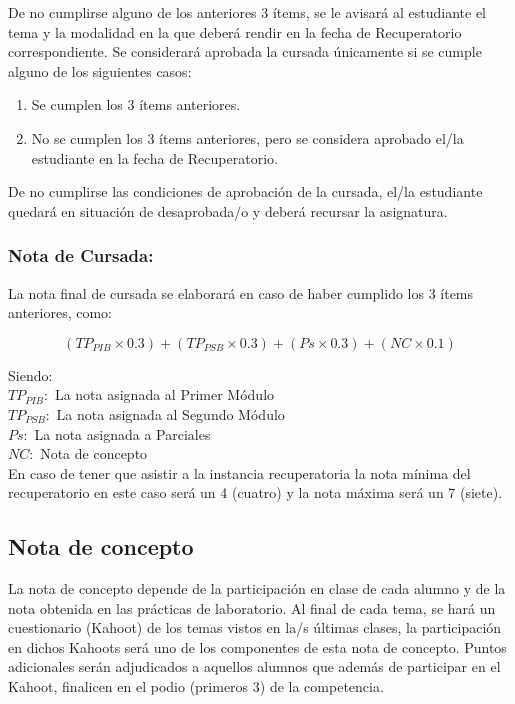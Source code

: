 \documentclass[10pt]{article}
\begin{document}
\vspace{0.25cm}
De no cumplirse alguno de los anteriores 3  ítems, se le avisará al estudiante el tema y la modalidad en la que deberá rendir en la fecha de Recuperatorio correspondiente. Se considerará aprobada la cursada  únicamente si se cumple alguno de los siguientes casos:
\begin{enumerate}
    \item Se cumplen los 3  ítems anteriores.
    \item No se cumplen los 3 ítems anteriores, pero se considera aprobado el/la estudiante en la fecha de Recuperatorio.
\end{enumerate}

De no cumplirse las condiciones de aprobación de la cursada, el/la estudiante quedará en situación de desaprobada/o y deberá recursar la asignatura.

\subsubsection*{Nota de Cursada:}

La nota final de cursada se elaborará en caso de haber cumplido los 3 ítems anteriores, como:

\begin{equation*}
    (TP_{PIB} \times 0.3) + (TP_{PSB} \times 0.3) + (Ps\times0.3) + (NC\times0.1)
\end{equation*}

    Siendo:\\
    $TP_{PIB}:$ La nota asignada al Primer Módulo\\
    $TP_{PSB}:$ La nota asignada al Segundo Módulo\\
    $Ps:$ La nota asignada a Parciales\\
    $NC:$ Nota de concepto\\
    
En caso de tener que asistir a la instancia recuperatoria la nota mínima del recuperatorio en este caso será un 4 (cuatro) y la nota máxima será un 7 (siete).


\subsection{Nota de concepto}

La nota de concepto depende de la participación en clase de cada alumno y de la nota obtenida en las prácticas de laboratorio. Al final de cada tema, se hará un cuestionario (Kahoot) de los temas vistos en la/s últimas clases, la participación en dichos Kahoots será uno de los componentes de esta nota de concepto. Puntos adicionales serán adjudicados a aquellos alumnos que además de participar en el Kahoot, finalicen en el podio (primeros 3) de la competencia. 
\end{document}
